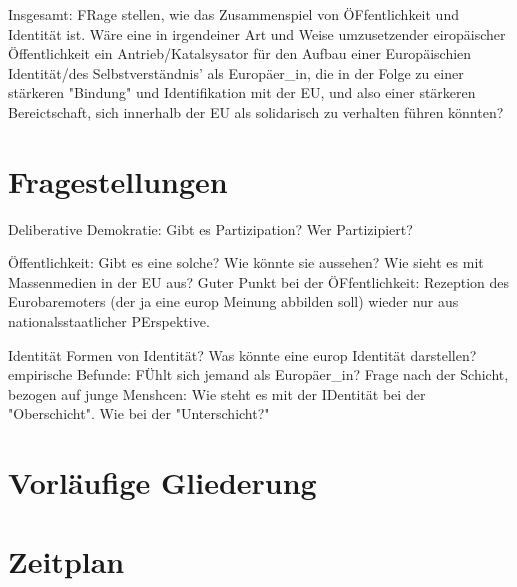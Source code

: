 \documentclass[a4paper, german, oneside]{scrartcl}
\begin{document}
Insgesamt: FRage stellen, wie das Zusammenspiel von ÖFfentlichkeit und Identität ist. Wäre eine in irgendeiner Art und Weise umzusetzender eiropäischer Öffentlichkeit ein Antrieb/Katalsysator für den Aufbau einer Europäischien Identität/des Selbstverständnis' als Europäer\_in, die in der Folge zu einer stärkeren "Bindung" und Identifikation mit der EU, und also einer stärkeren Bereictschaft, sich innerhalb der EU als solidarisch zu verhalten führen könnten?



\section{Fragestellungen}

Deliberative Demokratie: Gibt es Partizipation? Wer Partizipiert? 

Öffentlichkeit: Gibt es eine solche? Wie könnte sie aussehen? Wie sieht es mit Massenmedien in der EU aus?
Guter Punkt bei der ÖFfentlichkeit: Rezeption des Eurobaremoters (der ja eine europ Meinung abbilden soll) wieder nur aus nationalsstaatlicher PErspektive.

Identität
Formen von Identität?
Was könnte eine europ Identität darstellen?
empirische Befunde: FÜhlt sich jemand als Europäer\_in?
Frage nach der Schicht, bezogen auf junge Menshcen: Wie steht es mit der IDentität bei der "Oberschicht". Wie bei der "Unterschicht?"



\section{Vorläufige Gliederung}

\section{Zeitplan}

\printbibliography[filter=LV]
\end{document}
